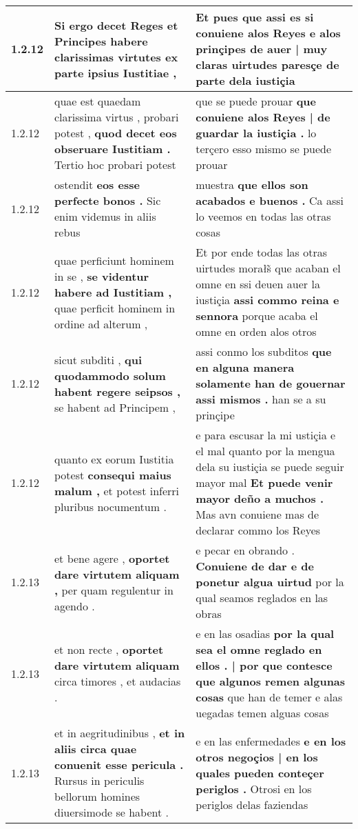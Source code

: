 \begin{tabular}{|p{1cm}|p{6.5cm}|p{6.5cm}|}
1.2.12 & Si ergo decet Reges et Principes \textbf{ habere clarissimas virtutes } ex parte ipsius Iustitiae , & Et pues que assi es si conuiene alos Reyes \textbf{ e alos prinçipes de auer | muy claras } uirtudes paresçe de parte dela iustiçia \\\hline
1.2.12 & quae est quaedam clarissima virtus , probari potest , \textbf{ quod decet eos obseruare Iustitiam . } Tertio hoc probari potest & que se puede prouar \textbf{ que conuiene alos Reyes | de guardar la iustiçia . } lo terçero esso mismo se puede prouar \\\hline
1.2.12 & ostendit \textbf{ eos esse perfecte bonos . } Sic enim videmus in aliis rebus & muestra \textbf{ que ellos son acabados e buenos . } Ca assi lo veemos en todas las otras cosas \\\hline
1.2.12 & quae perficiunt hominem in se , \textbf{ se videntur habere ad Iustitiam , } quae perficit hominem in ordine ad alterum , & Et por ende todas las otras uirtudes morałs̃ que acaban el omne en ssi deuen auer la iustiçia \textbf{ assi commo reina e sennora } porque acaba el omne en orden alos otros \\\hline
1.2.12 & sicut subditi , \textbf{ qui quodammodo solum habent regere seipsos , } se habent ad Principem , & assi conmo los subditos \textbf{ que en alguna manera solamente han de gouernar assi mismos . } han se a su prinçipe \\\hline
1.2.12 & quanto ex eorum Iustitia potest \textbf{ consequi maius malum , } et potest inferri pluribus nocumentum . & e para escusar la mi ustiçia e el mal quanto por la mengua dela su iustiçia se puede seguir mayor mal \textbf{ Et puede venir mayor deño a muchos . } Mas avn conuiene mas de declarar commo los Reyes \\\hline
1.2.13 & et bene agere , \textbf{ oportet dare virtutem aliquam , } per quam regulentur in agendo . & e pecar en obrando . \textbf{ Conuiene de dar e de ponetur algua uirtud } por la qual seamos reglados en las obras \\\hline
1.2.13 & et non recte , \textbf{ oportet dare virtutem aliquam } circa timores , et audacias . & e en las osadias \textbf{ por la qual sea el omne reglado en ellos . | por que contesce que algunos remen algunas cosas } que han de temer e alas uegadas temen alguas cosas \\\hline
1.2.13 & et in aegritudinibus , \textbf{ et in aliis circa quae conuenit esse pericula . } Rursus in periculis bellorum homines diuersimode se habent . & e en las enfermedades \textbf{ e en los otros negoçios | en los quales pueden conteçer periglos . } Otrosi en los periglos delas faziendas \\\hline

\end{tabular}
